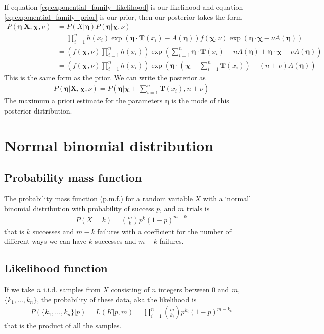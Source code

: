 \documentclass[a4paper,12pt]{article}
\theoremstyle{definition}
\begin{document}
If equation \ref{eq:exponential_family_likelihood} is our likelihood and equation \ref{eq:exponential_family_prior} is our prior, then our posterior takes the form
\begin{align}
  P(\boldsymbol{\eta} | \mathbf{X}, \boldsymbol{\chi}, \nu) & = P(X | \boldsymbol{\eta}) P(\boldsymbol{\eta} | \boldsymbol{\chi}, \nu) \\
  & = \prod_{i=1}^n h(x_i) \exp \left( \boldsymbol{\eta}\cdot \mathbf{T}(x_i) - A(\boldsymbol{\eta}) \right) f(\boldsymbol{\chi}, \nu)\exp (\boldsymbol{\eta} \cdot \boldsymbol{\chi} - \nu A(\boldsymbol{\eta})) \\ 
  & = \left( f(\boldsymbol{\chi}, \nu) \prod_{i=1}^n h(x_i) \right) \exp \left( \sum_{i=1}^n \boldsymbol{\eta} \cdot \mathbf{T}(x_i) - nA(\boldsymbol{\eta}) + \boldsymbol{\eta} \cdot \boldsymbol{\chi} - \nu A(\boldsymbol{\eta}) \right) \\
  & = \left( f(\boldsymbol{\chi}, \nu) \prod_{i=1}^n h(x_i) \right) \exp \left( \boldsymbol{\eta} \cdot \left(\boldsymbol{\chi} + \sum_{i=1}^n\mathbf{T}(x_i) \right) - (n + \nu) A(\boldsymbol{\eta}) \right)
\end{align}
This is the same form as the prior. We can write the posterior as 
\begin{align}
  P(\boldsymbol{\eta} | \mathbf{X}, \boldsymbol{\chi}, \nu) = P (\boldsymbol{\eta} | \boldsymbol{\chi} + \sum_{i=1}^n\mathbf{T}(x_i) , n + \nu )
\end{align}
The maximum a priori estimate for the parameters $\boldsymbol{\eta}$ is the mode of this posterior distribution.

\section{Normal binomial distribution}\label{normal}
\subsection{Probability mass function}
The probability mass function (p.m.f.) for a random variable $X$ with a `normal' binomial distribution with probability of success $p$, and $m$ trials is
\begin{align}
  P(X=k) = \binom{m}{k} p^k (1-p)^{m-k}
\end{align}
that is $k$ successes and $m-k$ failures with a coefficient for the number of different ways we can have $k$ successes and $m-k$ failures. 

\subsection{Likelihood function}
If we take $n$ i.i.d. samples from $X$ consisting of $n$ integers between $0$ and $m$, $\lbrace k_1, \dots , k_n \rbrace$, the probability of these data, aka the likelihood is
\begin{align}
  P(\lbrace k_1, \dots , k_n \rbrace | p) = L(K|p, m) = \prod_{i=1}^n \binom{m}{k_i} p^{k_i}(1-p)^{m-k_i}
\end{align}
that is the product of all the samples.
\end{document}
